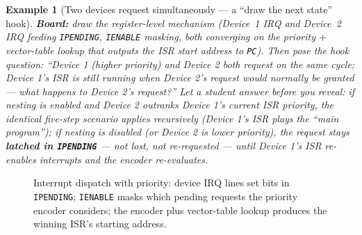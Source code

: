 \documentclass[11pt]{article}
\newtheorem{example}{Example}[section]
\begin{document}
\begin{example}[Two devices request simultaneously --- a ``draw the next state'' hook]
\label{ex:nestingboard}
\textbf{Board:} draw the register-level mechanism (Device~1 IRQ and Device~2 IRQ feeding \texttt{IPENDING}, \texttt{IENABLE} masking, both converging on the priority $+$ vector-table lookup that outputs the ISR start address to \texttt{PC}). Then pose the hook question: ``Device 1 (higher priority) and Device 2 both request on the same cycle; Device 1's ISR is still running when Device 2's request would normally be granted --- what happens to Device 2's request?'' Let a student answer before you reveal: if nesting is enabled and Device 2 outranks Device 1's current ISR priority, the identical five-step scenario applies recursively (Device 1's ISR plays the ``main program''); if nesting is disabled (or Device 2 is lower priority), the request stays \textbf{latched in \texttt{IPENDING}} --- not lost, not re-requested --- until Device 1's ISR re-enables interrupts and the encoder re-evaluates.
\end{example}

\begin{figure}[h]
  \centering
  \caption{Interrupt dispatch with priority: device IRQ lines set bits in \texttt{IPENDING}; \texttt{IENABLE} masks which pending requests the priority encoder considers; the encoder plus vector-table lookup produces the winning ISR's starting address.}
  \label{fig:nesting}
\end{figure}
\end{document}
